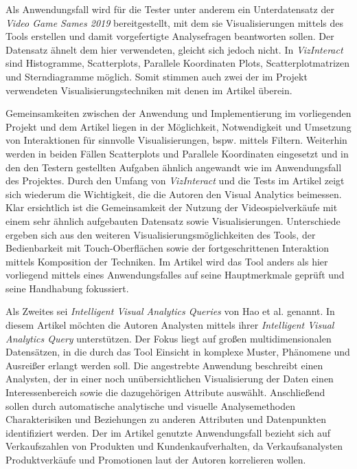 \documentclass[usegeometry=true]{scrartcl}
\begin{document}
Als Anwendungsfall wird für die Tester unter anderem ein Unterdatensatz der \textit{Video Game Sames 2019} bereitgestellt, mit dem sie Visualisierungen mittels des Tools erstellen und damit vorgefertigte Analysefragen beantworten sollen.
Der Datensatz ähnelt dem hier verwendeten, gleicht sich jedoch nicht. 
In \textit{VizInteract} sind Histogramme, Scatterplots, Parallele Koordinaten Plots, Scatterplotmatrizen und Sterndiagramme möglich. 
Somit stimmen auch zwei der im Projekt verwendeten Visualisierungstechniken mit denen im Artikel überein. 

Gemeinsamkeiten zwischen der Anwendung und Implementierung im vorliegenden Projekt und dem Artikel liegen in der Möglichkeit, Notwendigkeit und Umsetzung von Interaktionen für sinnvolle Visualisierungen, bspw. mittels Filtern.
Weiterhin werden in beiden Fällen Scatterplots und Parallele Koordinaten eingesetzt und in den den Testern gestellten Aufgaben ähnlich angewandt wie im Anwendungsfall des Projektes. 
Durch den Umfang von \textit{VizInteract} und die Tests im Artikel zeigt sich wiederum die Wichtigkeit, die die Autoren den Visual Analytics beimessen.
Klar ersichtlich ist die Gemeinsamkeit der Nutzung der Videospielverkäufe mit einem sehr ähnlich aufgebauten Datensatz sowie Visualisierungen.
Unterschiede ergeben sich aus den weiteren Visualisierungsmöglichkeiten des Tools, der Bedienbarkeit mit Touch-Oberflächen sowie der fortgeschrittenen Interaktion mittels Komposition der Techniken. 
Im Artikel wird das Tool anders als hier vorliegend mittels eines Anwendungsfalles auf seine Hauptmerkmale geprüft und seine Handhabung fokussiert.

Als Zweites sei \textit{Intelligent Visual Analytics Queries} von Hao et al. genannt.\cite{Hao.2007}
In diesem Artikel möchten die Autoren Analysten mittels ihrer \textit{Intelligent Visual Analytics Query} unterstützen.
Der Fokus liegt auf großen multidimensionalen Datensätzen, in die durch das Tool Einsicht in komplexe Muster, Phänomene und Ausreißer erlangt werden soll.
Die angestrebte Anwendung beschreibt einen Analysten, der in einer noch unübersichtlichen Visualisierung der Daten einen Interessenbereich sowie die dazugehörigen Attribute auswählt.
Anschließend sollen durch automatische analytische und visuelle Analysemethoden Charakterisiken und Beziehungen zu anderen Attributen und Datenpunkten identifiziert werden.
Der im Artikel genutzte Anwendungsfall bezieht sich auf Verkaufszahlen von Produkten und Kundenkaufverhalten, da Verkaufsanalysten Produktverkäufe und Promotionen laut der Autoren korrelieren wollen. 
\end{document}
